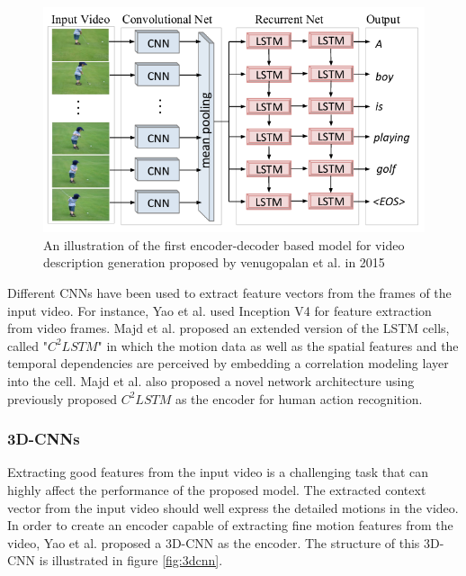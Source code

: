\documentclass[preprint, 10pt]{elsarticle}
\begin{document}
		\begin{figure}[h]
			\centering
			\includegraphics[scale=0.5]{Imgs/vid1.png}
			\caption{An illustration of the first encoder-decoder based model for video description generation proposed by venugopalan et al. in 2015 \cite{venugopalan2014translating}}
			\label{fig:vid1}
		\end{figure}
	
		Different CNNs have been used to extract feature vectors from the frames of the input video. For instance, Yao et al. \cite{yao2017boosting} used Inception V4 \cite{szegedy2017inception} for feature extraction from video frames. Majd et al. \cite{majd2018correlation} proposed an extended version of the LSTM cells, called "\textit{$C^2LSTM$}" in which the motion data  as well as the spatial features and the temporal dependencies are perceived by embedding a correlation modeling layer into the cell. Majd et al. \cite{majd2019motion} also proposed a novel network architecture using previously proposed $C^2LSTM$ as the encoder for human action recognition.
	
		\subsubsection{3D-CNNs}
		Extracting good features from the input video is a challenging task that can highly affect the performance of the proposed model. The extracted context vector from the input video should well express the detailed motions in the video. In order to create an encoder capable of extracting fine motion features from the video, Yao et al. \cite{yao2015describing} proposed a 3D-CNN as the encoder. The structure of this 3D-CNN is illustrated in figure \ref{fig:3dcnn}.
		
\end{document}
